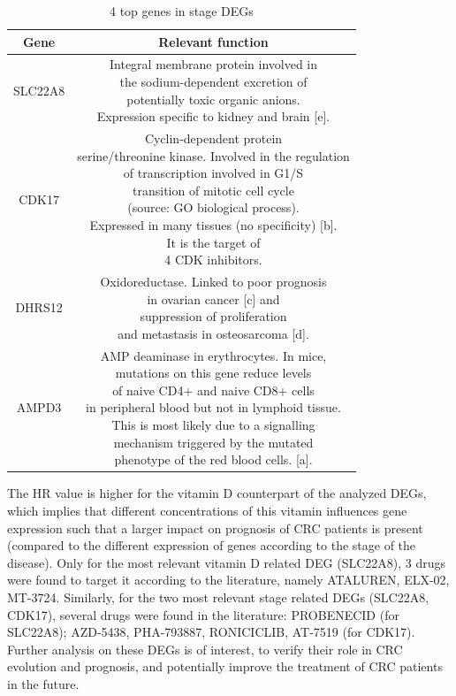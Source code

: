 \documentclass[fleqn,10pt]{SelfArx} %
\begin{document}
\begin{table}[ht]
	\small
	\centering
	\begin{tabular}{cc}
		\hline
		Gene & Relevant function\\
		\hline
		SLC22A8 & \makecell{Integral membrane protein involved in\\the sodium-dependent excretion of\\potentially toxic organic anions.\\Expression specific to kidney and brain [e].}\\
		CDK17 & \makecell{Cyclin-dependent protein \\serine/threonine kinase. Involved in the regulation \\of transcription involved in G1/S\\transition of mitotic cell cycle\\(source: GO biological process).\\Expressed in many tissues (no specificity) [b].\\It is the target of\\4 CDK inhibitors.}\\
		DHRS12 & \makecell{Oxidoreductase. Linked to poor prognosis\\in ovarian cancer [c] and\\suppression of proliferation\\and metastasis in osteosarcoma [d].}\\
		AMPD3 & \makecell{AMP deaminase in erythrocytes. In mice,\\mutations on this gene reduce levels\\of naive CD4+ and naive CD8+ cells\\in peripheral blood but not in lymphoid tissue.\\This is most likely due to a signalling\\mechanism triggered by the mutated\\phenotype of the red blood cells. [a].}\\
		\hline
	\end{tabular}
	\caption{4 top genes in stage DEGs}
	\label{tab:deg_char}
\end{table}
The HR value is higher for the vitamin D counterpart of the analyzed DEGs, which implies that different concentrations of this vitamin influences gene expression such that a larger impact on prognosis of CRC patients is present (compared to the different expression of genes according to the stage of the disease).
Only for the most relevant vitamin D related DEG (SLC22A8), 3 drugs were found to target it according to the literature, namely ATALUREN, ELX-02, MT-3724. Similarly, for the two most relevant stage related DEGs (SLC22A8, CDK17), several drugs were found in the literature: PROBENECID (for SLC22A8); AZD-5438, PHA-793887, RONICICLIB, AT-7519 (for CDK17). Further analysis on these DEGs is of interest, to verify their role in CRC evolution and prognosis, and potentially improve the treatment of CRC patients in the future.





\end{document}
